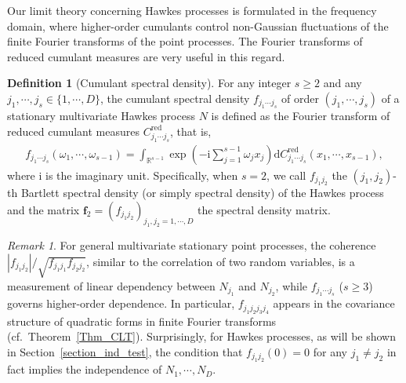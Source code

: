\documentclass[11pt]{article}
\numberwithin{equation}{section}
\theoremstyle{plain}
\theoremstyle{definition}
\theoremstyle{definition}
\newtheorem{definition}{Definition}
\theoremstyle{assumption}
\theoremstyle{proposition}
\theoremstyle{proposition}
\theoremstyle{example}
\theoremstyle{lemma}
\theoremstyle{theorem}
\theoremstyle{remark}
\newtheorem*{remark}{Remark}
\begin{document}
Our limit theory concerning Hawkes processes is formulated in the frequency domain, where higher-order cumulants control non-Gaussian fluctuations of the finite Fourier transforms of the point processes. The Fourier transforms of reduced cumulant measures are very useful in this regard. 
\begin{definition}[Cumulant spectral density]\label{HPcsd_def}
For any integer $s\geqslant 2$ and any $j_1,\cdots,j_s\in\{1,\cdots,D\}$, the cumulant spectral density $f_{j_1\cdots j_s}$ of order $(j_1,\cdots, j_s)$ of a stationary multivariate Hawkes process $N$ is defined as the Fourier transform of reduced cumulant measures $C_{j_1\cdots j_s}^{\mathrm{red}}$, that is,
\begin{align*}
f_{j_1\cdots j_s}(\omega_1,\cdots,\omega_{s-1})
= \int_{\mathbb{R}^{s-1}}\exp\left(-\mathrm{i}\sum_{j=1}^{s-1}\omega_j x_j\right)\mathrm{d}C_{j_1\cdots j_s}^{\mathrm{red}}(x_1,\cdots,x_{s-1}),
\end{align*}
where $\mathrm{i}$ is the imaginary unit. Specifically, when $s=2$, we call $f_{j_1 j_2}$ the $(j_1,j_2)$-th Bartlett spectral density (or simply spectral density) of the Hawkes process and the matrix $\boldsymbol{f}_2 = (f_{j_1 j_2})_{j_1,j_2=1,\cdots,D}$ the spectral density matrix.
\end{definition}

{\begin{remark}
For general multivariate stationary point processes, the coherence $|f_{j_1j_2}|/\sqrt{f_{j_1j_1}f_{j_2j_2}}$, similar to the correlation of two random variables, is a measurement of linear dependency between $N_{j_1}$ and $N_{j_2}$, while $f_{j_1\cdots j_s}$ ($s\geqslant3$) governs higher-order dependence. In particular, $f_{j_1j_2j_3j_4}$ appears in the covariance structure of quadratic forms in finite Fourier transforms (cf.\ Theorem~\ref{Thm_CLT}). Surprisingly, for Hawkes processes, as will be shown in Section~\ref{section_ind_test}, the condition that $f_{j_1j_2}(0) = 0$ for any $j_1\neq j_2$ in fact implies the independence of $N_1,\cdots,N_D$.
\end{remark}
}
\end{document}
